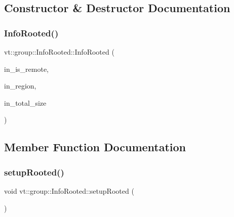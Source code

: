 \subsection{Constructor \& Destructor Documentation}
\mbox{\label{structvt_1_1group_1_1_info_rooted_a2eae545681022b5595355823efdf6e0d}} 
\subsubsection{\texorpdfstring{Info\+Rooted()}{InfoRooted()}}
{\footnotesize\ttfamily vt\+::group\+::\+Info\+Rooted\+::\+Info\+Rooted (\begin{DoxyParamCaption}\item[{bool const \&}]{in\+\_\+is\+\_\+remote,  }\item[{\hyperlink{structvt_1_1group_1_1_info_rooted_a127ac5ebcfb9871621c1f66dba481c0b}{Region\+Ptr\+Type}}]{in\+\_\+region,  }\item[{\hyperlink{structvt_1_1group_1_1region_1_1_region_a9bb381adf31111aae34dbc644bad6c1f}{Region\+Type\+::\+Size\+Type} const \&}]{in\+\_\+total\+\_\+size }\end{DoxyParamCaption})}



\subsection{Member Function Documentation}
\mbox{\label{structvt_1_1group_1_1_info_rooted_a8ac61be5b1f7b5316db4d7bd74f46389}} 
\subsubsection{\texorpdfstring{setup\+Rooted()}{setupRooted()}}
{\footnotesize\ttfamily void vt\+::group\+::\+Info\+Rooted\+::setup\+Rooted (\begin{DoxyParamCaption}{ }\end{DoxyParamCaption})\hspace{0.3cm}{\ttfamily [protected]}}



